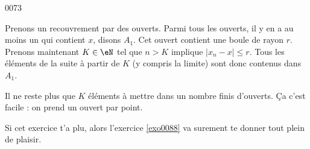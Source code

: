 
\begin{corrige}{0073}

Prenons un recouvrement par des ouverts. Parmi tous les ouverts, il y en a au moins un qui contient $x$, disons $A_1$. Cet ouvert contient une boule de rayon $r$. Prenons maintenant $K\in\eN$ tel que $n>K$ implique $| x_n-x |\leq r$. Tous les éléments de la suite à partir de $K$ (y compris la limite) sont donc contenus dans $A_1$.

Il ne reste plus que $K$ éléments à mettre dans un nombre finis d'ouverts. Ça c'est facile : on prend un ouvert par point.

Si cet exercice t'a plu, alors l'exercice \ref{exo0088} va surement te donner tout plein de plaisir.

\end{corrige}
